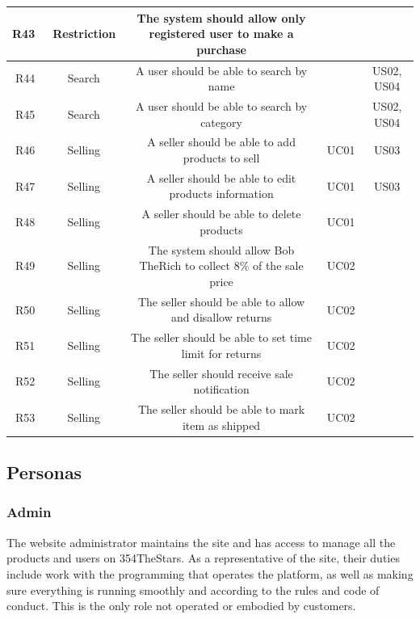 \documentclass[11pt]{article}
\newcounter{use case ID}
\begin{document}
\begin{table}[H]
\begin{adjustbox}{width=\columnwidth,center}
\begin{tabular}{|r | c| c | c| c|}
                \hline
                R43 & \ Restriction & The system should allow only \index{registered user}registered user to make a purchase & &  \\
                \hline
                R44 & \ Search & A user should be able to search by name & & US02, US04 \\
                \hline
                R45 & \ Search & A user should be able to search by category & & US02, US04 \\
                \hline
                R46 & \ Selling & A \index{seller}seller should be able to add products to sell & UC01 & US03 \\
                \hline
                R47 & \ Selling & A seller should be able to edit products \index{information}information & UC01 & US03 \\
                \hline
                R48 & \ Selling & A seller should be able to delete \index{product}products & UC01 &  \\
                \hline
                R49 & \ Selling & The system should allow Bob TheRich to collect 8\% of the sale price & UC02 &  \\
                \hline
                R50 & \ Selling & The seller should be able to allow and disallow returns & UC02 &  \\
                \hline
                R51 & \ Selling & The seller should be able to set time limit for returns & UC02 &  \\
                \hline
                R52 & \ Selling & The seller should receive sale notification & UC02 &  \\
                \hline
                R53 & \ Selling & The seller should be able to mark item as shipped & UC02 &  \\
                \hline
        \end{tabular}
    \end{adjustbox}
\end{table}
\clearpage


\subsection{Personas} \label{actors}
\subsubsection{Admin}
The website administrator maintains the site and has access to manage all the
products and users on 354TheStars. As a representative of the site, their duties include
work with the programming that operates the platform, as well as making sure
everything is running smoothly and according to the rules and code of conduct.
This is the only role not operated or embodied by customers.
\end{document}
